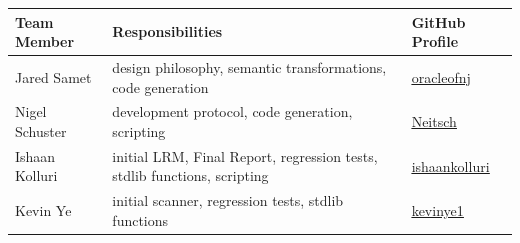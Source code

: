 \begin{tabular}{ | l | l | l |}\hline
  Team Member  & Responsibilities      & GitHub Profile\\ \hline
  Jared Samet & design philosophy, semantic transformations, code generation  & \underline{\href{https://github.com/oracleofnj}{oracleofnj}}\\
  Nigel Schuster & development protocol, code generation, scripting  & \underline{\href{https://github.com/Neitsch}{Neitsch}}\\
  Ishaan Kolluri & initial LRM, Final Report, regression tests, stdlib functions, scripting & \underline{\href{https://github.com/ishaankolluri}{ishaankolluri}}\\
  Kevin Ye & initial scanner, regression tests, stdlib functions & \underline{\href{https://github.com/kevinye1}{kevinye1}}\\ \hline
\end{tabular}
